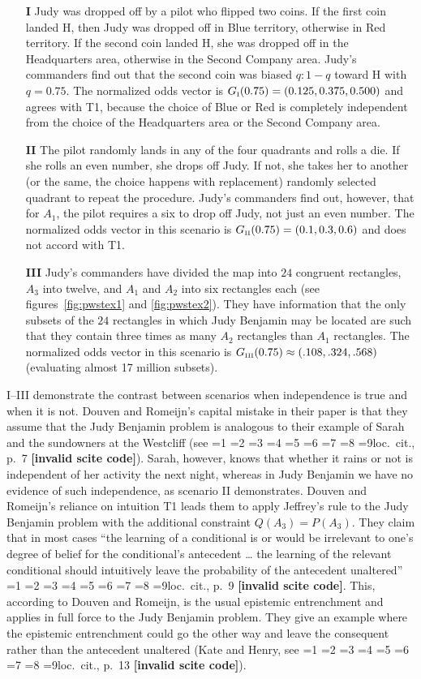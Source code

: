 \documentclass[12pt]{article}
\newcommand{\qeins}[1]{``#1''}
\newif\ifNumericalOrYear
\newcommand{\PageP}{p.~}
\newcommand{\PageP}{}
\newcommand{\scite}[3]{\ifnum#1=1\ifNumericalOrYear\citep{#2}\else\citeyearpar{#2}\fi\else
\ifnum#1=2\ifNumericalOrYear\citep[#3]{#2}\else\citep[{\PageP}#3]{#2}\fi\else
\ifnum#1=3\ifNumericalOrYear(\citet[#3]{#2})\else\citep[{\PageP}#3]{#2}\fi\else
\ifnum#1=4\ifNumericalOrYear\citet{#2}\else\citet{#2}\fi\else
\ifnum#1=5\ifNumericalOrYear(\citet{#2})\else\citep{#2}\fi\else
\ifnum#1=6\ifNumericalOrYear(\citet[#3]{#2})\else\citep[{\PageP}#3]{#2}\fi\else
\ifnum#1=7\ifNumericalOrYear\citep{#2}\else\citealp{#2}\fi\else
\ifnum#1=8\ifNumericalOrYear\citep[#3]{#2}\else\citealp[{\PageP}#3]{#2}\fi\else
\ifnum#1=9\ifNumericalOrYear\citep[#3]{#2}\else{}loc.\ cit., {\PageP}#3\fi\else
\textbf{[invalid scite code]}\fi\fi\fi\fi\fi\fi\fi\fi\fi}
\begin{document}
\begin{enumerate}
\item[\textbf{I}] Judy was dropped off by a pilot who flipped two
  coins. If the first coin landed H, then Judy was dropped off in Blue
  territory, otherwise in Red territory. If the second coin landed H,
  she was dropped off in the Headquarters area, otherwise in the
  Second Company area. Judy's commanders find out that the second coin
  was biased $q:1-q$ toward H with $q=0.75$. The normalized odds
  vector is $G_{\mbox{\tiny I}}(0.75)=(0.125,0.375,0.500)$ and agrees with T1, because the
  choice of Blue or Red is completely independent from the choice of
  the Headquarters area or the Second Company area.
\item[\textbf{II}] The pilot randomly lands in any of the four
  quadrants and rolls a die. If she rolls an even number, she drops
  off Judy. If not, she takes her to another (or the same, the choice
  happens with replacement) randomly selected quadrant to repeat the
  procedure. Judy's commanders find out, however, that for $A_{1}$,
  the pilot requires a six to drop off Judy, not just an even number.
  The normalized odds vector in this scenario is $G_{\mbox{\tiny
      II}}(0.75)=(0.1,0.3,0.6)$ and does not accord with T1.
\item[\textbf{III}] Judy's commanders have divided the map into $24$
  congruent rectangles, $A_{3}$ into twelve, and $A_{1}$ and $A_{2}$
  into six rectangles each (see figures~\ref{fig:pwstex1} and
  \ref{fig:pwstex2}). They have information that the only subsets of
  the $24$ rectangles in which Judy Benjamin may be located are such
  that they contain three times as many $A_{2}$ rectangles than
  $A_{1}$ rectangles. The normalized odds vector in this scenario is
  $G_{\mbox{\tiny III}}(0.75)\approx(.108,.324,.568)$ (evaluating almost
  17 million subsets).
\end{enumerate}

I--III demonstrate the contrast between scenarios when independence is
true and when it is not. Douven and Romeijn's capital mistake in their
paper is that they assume that the Judy Benjamin problem is analogous
to their example of Sarah and the sundowners at the Westcliff (see
\scite{8}{douvenromeijn09}{7}). Sarah, however, knows that whether it
rains or not is independent of her activity the next night, whereas in
Judy Benjamin we have no evidence of such independence, as scenario II
demonstrates. Douven and Romeijn's reliance on intuition T1 leads them
to apply Jeffrey's rule to the Judy Benjamin problem with the
additional constraint $Q(A_{3})=P(A_{3})$. They claim that in most
cases \qeins{the learning of a conditional is or would be irrelevant
  to one's degree of belief for the conditional's antecedent {\ldots}
  the learning of the relevant conditional should intuitively leave
  the probability of the antecedent unaltered}
\scite{2}{douvenromeijn09}{9}. This, according to Douven and Romeijn,
is the usual epistemic entrenchment and applies in full force to the
Judy Benjamin problem. They give an example where the epistemic
entrenchment could go the other way and leave the consequent rather
than the antecedent unaltered (Kate and Henry, see
\scite{8}{douvenromeijn09}{13}). 
\end{document}
